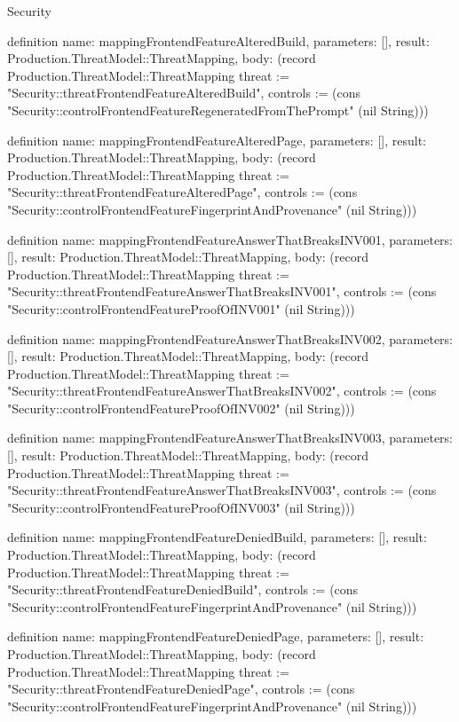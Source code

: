 \begin{lexlean}{Security}
\begin{semanticmodule}
definition{
  name: mappingFrontendFeatureAlteredBuild,
  parameters: [],
  result: Production.ThreatModel::ThreatMapping,
  body: (record Production.ThreatModel::ThreatMapping {threat := "Security::threatFrontendFeatureAlteredBuild", controls := (cons "Security::controlFrontendFeatureRegeneratedFromThePrompt" (nil String))})
}

definition{
  name: mappingFrontendFeatureAlteredPage,
  parameters: [],
  result: Production.ThreatModel::ThreatMapping,
  body: (record Production.ThreatModel::ThreatMapping {threat := "Security::threatFrontendFeatureAlteredPage", controls := (cons "Security::controlFrontendFeatureFingerprintAndProvenance" (nil String))})
}

definition{
  name: mappingFrontendFeatureAnswerThatBreaksINV001,
  parameters: [],
  result: Production.ThreatModel::ThreatMapping,
  body: (record Production.ThreatModel::ThreatMapping {threat := "Security::threatFrontendFeatureAnswerThatBreaksINV001", controls := (cons "Security::controlFrontendFeatureProofOfINV001" (nil String))})
}

definition{
  name: mappingFrontendFeatureAnswerThatBreaksINV002,
  parameters: [],
  result: Production.ThreatModel::ThreatMapping,
  body: (record Production.ThreatModel::ThreatMapping {threat := "Security::threatFrontendFeatureAnswerThatBreaksINV002", controls := (cons "Security::controlFrontendFeatureProofOfINV002" (nil String))})
}

definition{
  name: mappingFrontendFeatureAnswerThatBreaksINV003,
  parameters: [],
  result: Production.ThreatModel::ThreatMapping,
  body: (record Production.ThreatModel::ThreatMapping {threat := "Security::threatFrontendFeatureAnswerThatBreaksINV003", controls := (cons "Security::controlFrontendFeatureProofOfINV003" (nil String))})
}

definition{
  name: mappingFrontendFeatureDeniedBuild,
  parameters: [],
  result: Production.ThreatModel::ThreatMapping,
  body: (record Production.ThreatModel::ThreatMapping {threat := "Security::threatFrontendFeatureDeniedBuild", controls := (cons "Security::controlFrontendFeatureFingerprintAndProvenance" (nil String))})
}

definition{
  name: mappingFrontendFeatureDeniedPage,
  parameters: [],
  result: Production.ThreatModel::ThreatMapping,
  body: (record Production.ThreatModel::ThreatMapping {threat := "Security::threatFrontendFeatureDeniedPage", controls := (cons "Security::controlFrontendFeatureFingerprintAndProvenance" (nil String))})
}


\end{semanticmodule}
\end{lexlean}
